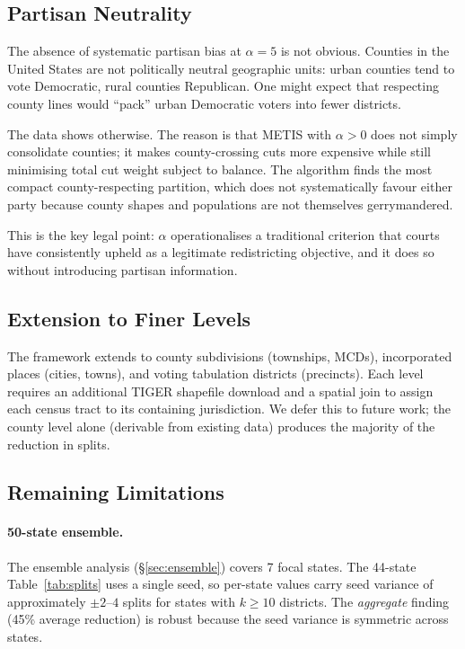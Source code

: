 \subsection{Partisan Neutrality}

The absence of systematic partisan bias at $\alpha = 5$ is not obvious.
Counties in the United States are not politically neutral geographic units:
urban counties tend to vote Democratic, rural counties Republican.
One might expect that respecting county lines would ``pack'' urban Democratic
voters into fewer districts.

The data shows otherwise.
The reason is that METIS with $\alpha > 0$ does not simply consolidate counties;
it makes county-crossing cuts more expensive while still minimising total cut
weight subject to balance.
The algorithm finds the most compact county-respecting partition, which does
not systematically favour either party because county shapes and populations
are not themselves gerrymandered.

This is the key legal point: $\alpha$ operationalises a traditional criterion
that courts have consistently upheld as a legitimate redistricting objective,
and it does so without introducing partisan information.

\subsection{Extension to Finer Levels}

The framework extends to county subdivisions (townships, MCDs), incorporated
places (cities, towns), and voting tabulation districts (precincts).
Each level requires an additional TIGER shapefile download and a spatial join
to assign each census tract to its containing jurisdiction.
We defer this to future work; the county level alone (derivable from existing
data) produces the majority of the reduction in splits.

\subsection{Remaining Limitations}

\paragraph{50-state ensemble.}
The ensemble analysis (§\ref{sec:ensemble}) covers 7 focal states.
The 44-state Table~\ref{tab:splits} uses a single seed, so per-state values
carry seed variance of approximately $\pm 2$--$4$ splits for states with
$k \geq 10$ districts.
The \emph{aggregate} finding (45\% average reduction) is robust because the
seed variance is symmetric across states.

